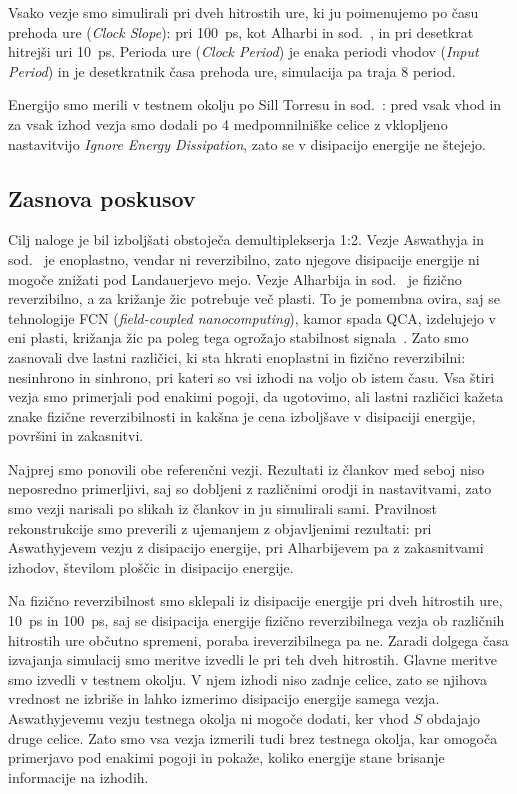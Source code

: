 Vsako vezje smo simulirali pri dveh hitrostih ure, ki ju poimenujemo po času prehoda ure (\emph{Clock Slope}): pri \SI{100}{\pico\second}, kot Alharbi in sod.~\cite{g21:alharbi2022}, in pri desetkrat hitrejši uri \SI{10}{\pico\second}. Perioda ure (\emph{Clock Period}) je enaka periodi vhodov (\emph{Input Period}) in je desetkratnik časa prehoda ure, simulacija pa traja 8 period.

Energijo smo merili v testnem okolju po Sill Torresu in sod.~\cite{silltorres2018}: pred vsak vhod in za vsak izhod vezja smo dodali po 4 medpomnilniške celice z vklopljeno nastavitvijo \emph{Ignore Energy Dissipation}, zato se v disipacijo energije ne štejejo.

\subsection{Zasnova poskusov}
\label{g21:sec:poskusi}

Cilj naloge je bil izboljšati obstoječa demultiplekserja 1:2. Vezje Aswathyja in sod.~\cite{g21:aswathy2024} je enoplastno, vendar ni reverzibilno, zato njegove disipacije energije ni mogoče znižati pod Landauerjevo mejo. Vezje Alharbija in sod.~\cite{g21:alharbi2022} je fizično reverzibilno, a za križanje žic potrebuje več plasti. To je pomembna ovira, saj se tehnologije FCN (\emph{field-coupled nanocomputing}), kamor spada QCA, izdelujejo v eni plasti, križanja žic pa poleg tega ogrožajo stabilnost signala~\cite{g21:hien2025}. Zato smo zasnovali dve lastni različici, ki sta hkrati enoplastni in fizično reverzibilni: nesinhrono in sinhrono, pri kateri so vsi izhodi na voljo ob istem času. Vsa štiri vezja smo primerjali pod enakimi pogoji, da ugotovimo, ali lastni različici kažeta znake fizične reverzibilnosti in kakšna je cena izboljšave v disipaciji energije, površini in zakasnitvi.

Najprej smo ponovili obe referenčni vezji. Rezultati iz člankov med seboj niso neposredno primerljivi, saj so dobljeni z različnimi orodji in nastavitvami, zato smo vezji narisali po slikah iz člankov in ju simulirali sami. Pravilnost rekonstrukcije smo preverili z ujemanjem z objavljenimi rezultati: pri Aswathyjevem vezju z disipacijo energije, pri Alharbijevem pa z zakasnitvami izhodov, številom ploščic in disipacijo energije.

Na fizično reverzibilnost smo sklepali iz disipacije energije pri dveh hitrostih ure, \SI{10}{\pico\second} in \SI{100}{\pico\second}, saj se disipacija energije fizično reverzibilnega vezja ob različnih hitrostih ure občutno spremeni, poraba ireverzibilnega pa ne. Zaradi dolgega časa izvajanja simulacij smo meritve izvedli le pri teh dveh hitrostih. Glavne meritve smo izvedli v testnem okolju. V njem izhodi niso zadnje celice, zato se njihova vrednost ne izbriše in lahko izmerimo disipacijo energije samega vezja. Aswathyjevemu vezju testnega okolja ni mogoče dodati, ker vhod $S$ obdajajo druge celice. Zato smo vsa vezja izmerili tudi brez testnega okolja, kar omogoča primerjavo pod enakimi pogoji in pokaže, koliko energije stane brisanje informacije na izhodih.

